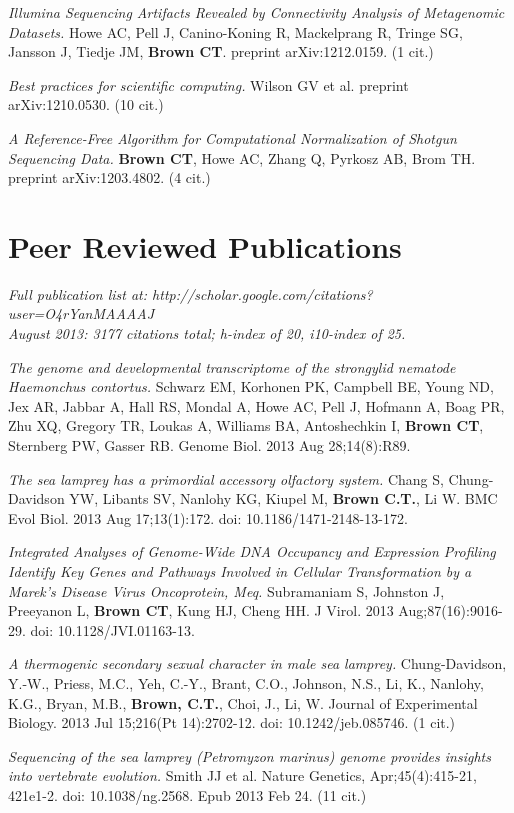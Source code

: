 \documentclass[margin,line]{resume}
\begin{document}
\begin{resume}
\newpage

{\em Illumina Sequencing Artifacts Revealed by Connectivity Analysis of Metagenomic Datasets.} Howe AC, Pell J, Canino-Koning R, Mackelprang R, Tringe SG, Jansson J, Tiedje JM, {\bf Brown CT}. preprint arXiv:1212.0159. (1 cit.)

{\em Best practices for scientific computing.} Wilson GV et al. preprint arXiv:1210.0530. (10 cit.)

{\em A Reference-Free Algorithm for Computational Normalization of Shotgun Sequencing Data.} {\bf Brown CT}, Howe AC, Zhang Q, Pyrkosz AB, Brom TH. preprint arXiv:1203.4802. (4 cit.)

    \section{\mysidestyle Peer Reviewed Publications}

{\em Full publication list at: http://scholar.google.com/citations?user=O4rYanMAAAAJ\\
August 2013: 3177 citations total; h-index of 20, i10-index of 25.}

{\em The genome and developmental transcriptome of the strongylid
  nematode Haemonchus contortus.}  Schwarz EM, Korhonen PK, Campbell
BE, Young ND, Jex AR, Jabbar A, Hall RS, Mondal A, Howe AC, Pell J,
Hofmann A, Boag PR, Zhu XQ, Gregory TR, Loukas A, Williams BA,
Antoshechkin I, {\bf Brown CT}, Sternberg PW, Gasser RB.  Genome
Biol. 2013 Aug 28;14(8):R89.

{\em The sea lamprey has a primordial accessory olfactory system.}
Chang S, Chung-Davidson YW, Libants SV, Nanlohy KG, Kiupel M, {\bf
  Brown C.T.}, Li W. BMC Evol Biol. 2013 Aug 17;13(1):172. doi:
10.1186/1471-2148-13-172.

{\em Integrated Analyses of Genome-Wide DNA Occupancy and Expression
  Profiling Identify Key Genes and Pathways Involved in Cellular
  Transformation by a Marek's Disease Virus Oncoprotein, Meq.}
Subramaniam S, Johnston J, Preeyanon L, {\bf Brown CT}, Kung HJ, Cheng
HH. J Virol. 2013 Aug;87(16):9016-29. doi: 10.1128/JVI.01163-13.

{\em A thermogenic secondary sexual character in male sea lamprey.}
Chung-Davidson, Y.-W., Priess, M.C., Yeh, C.-Y., Brant, C.O., Johnson,
N.S., Li, K., Nanlohy, K.G., Bryan, M.B., {\bf Brown, C.T.}, Choi, J.,
Li, W. Journal of Experimental Biology. 2013 Jul 15;216(Pt
14):2702-12. doi: 10.1242/jeb.085746. (1 cit.)

{\em Sequencing of the sea lamprey (Petromyzon marinus) genome provides insights into vertebrate evolution.} Smith JJ et al. Nature Genetics, Apr;45(4):415-21, 421e1-2. doi: 10.1038/ng.2568. Epub 2013 Feb 24. (11 cit.)


\end{resume}
\end{document}
